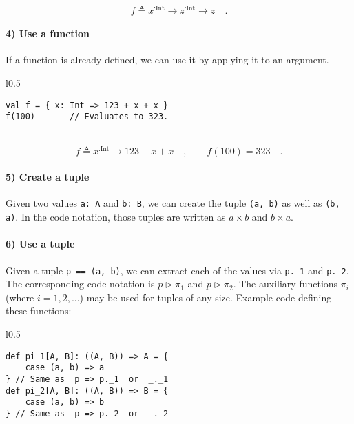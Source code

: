 ~\vspace{-0.35\baselineskip}
\[
f\triangleq x^{:\text{Int}}\rightarrow z^{:\text{Int}}\rightarrow z\quad.
\]
\vspace{-0.85\baselineskip}


\paragraph{4) Use a function}

If a function is already defined, we can use it by applying it to
an argument.

\begin{wrapfigure}{l}{0.5\columnwidth}%
\vspace{-0.65\baselineskip}
\begin{lstlisting}
val f = { x: Int => 123 + x + x }
f(100)       // Evaluates to 323.
\end{lstlisting}

\vspace{-0.25\baselineskip}
\end{wrapfigure}%

~\vspace{-0.65\baselineskip}
\[
f\triangleq x^{:\text{Int}}\rightarrow123+x+x\quad,\quad\quad f(100)=323\quad.
\]
\vspace{-0.85\baselineskip}


\paragraph{5) Create a tuple}

Given two values \lstinline!a: A! and \lstinline!b: B!, we can create
the tuple \lstinline!(a, b)! as well as \lstinline!(b, a)!. In the
code notation, those tuples are written as $a\times b$ and $b\times a$.

\paragraph{6) Use a tuple}

Given a tuple \lstinline!p == (a, b)!, we can extract each of the
values via \lstinline!p._1! and \lstinline!p._2!. The corresponding
code notation is $p\triangleright\pi_{1}$ and $p\triangleright\pi_{2}$.
The auxiliary functions $\pi_{i}$ (where $i=1,2,...$) may be used
for tuples of any size. Example code defining these functions:

\begin{wrapfigure}{l}{0.5\columnwidth}%
\vspace{-0.75\baselineskip}
\begin{lstlisting}
def pi_1[A, B]: ((A, B)) => A = {
    case (a, b) => a
} // Same as  p => p._1  or  _._1
def pi_2[A, B]: ((A, B)) => B = {
    case (a, b) => b
} // Same as  p => p._2  or  _._2
\end{lstlisting}

\vspace{-1.2\baselineskip}
\end{wrapfigure}%

